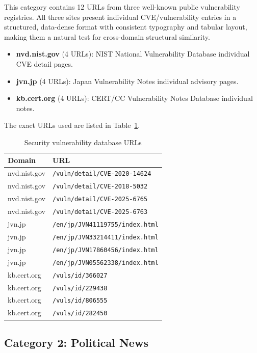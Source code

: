 This category contains 12 URLs from three well-known public vulnerability registries. All three sites present individual CVE/vulnerability entries in a structured, data-dense format with consistent typography and tabular layout, making them a natural test for cross-domain structural similarity.

\begin{itemize}
    \item \textbf{nvd.nist.gov} (4 URLs): NIST National Vulnerability Database individual CVE detail pages.
    \item \textbf{jvn.jp} (4 URLs): Japan Vulnerability Notes individual advisory pages.
    \item \textbf{kb.cert.org} (4 URLs): CERT/CC Vulnerability Notes Database individual notes.
\end{itemize}

The exact URLs used are listed in Table~\ref{tab:urls-security}.

\begin{table}[htbp]
\centering
\caption{Security vulnerability database URLs}
\label{tab:urls-security}
\begin{tabular}{ll}
\toprule
\textbf{Domain} & \textbf{URL} \\
\midrule
nvd.nist.gov & \texttt{/vuln/detail/CVE-2020-14624} \\
nvd.nist.gov & \texttt{/vuln/detail/CVE-2018-5032} \\
nvd.nist.gov & \texttt{/vuln/detail/CVE-2025-6765} \\
nvd.nist.gov & \texttt{/vuln/detail/CVE-2025-6763} \\
jvn.jp & \texttt{/en/jp/JVN41119755/index.html} \\
jvn.jp & \texttt{/en/jp/JVN33214411/index.html} \\
jvn.jp & \texttt{/en/jp/JVN17860456/index.html} \\
jvn.jp & \texttt{/en/jp/JVN05562338/index.html} \\
kb.cert.org & \texttt{/vuls/id/366027} \\
kb.cert.org & \texttt{/vuls/id/229438} \\
kb.cert.org & \texttt{/vuls/id/806555} \\
kb.cert.org & \texttt{/vuls/id/282450} \\
\bottomrule
\end{tabular}
\end{table}

\subsection{Category 2: Political News}
\label{subsec:cat-news}


